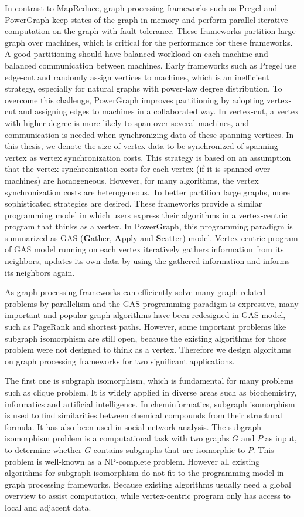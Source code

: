 In contrast to MapReduce, graph processing frameworks such as Pregel\cite{malewicz2010pregel} and PowerGraph\cite{gonzalez2012powergraph} keep states of the graph in memory and perform parallel iterative computation on the graph with fault tolerance. These frameworks partition large graph over machines, which is critical for the performance for these frameworks. A good partitioning should have balanced workload on each machine and balanced communication between machines. Early frameworks such as Pregel use edge-cut and randomly assign vertices to machines, which is an inefficient strategy, especially for natural graphs with power-law degree distribution. To overcome this challenge, PowerGraph improves partitioning by adopting vertex-cut and assigning edges to machines in a collaborated way. In vertex-cut, a vertex with higher degree is more likely to span over several machines, and communication is needed when synchronizing data of these spanning vertices. In this thesis, we denote the size of vertex data to be synchronized of spanning vertex as vertex synchronization costs. This strategy is based on an assumption that the vertex synchronization costs for each vertex (if it is spanned over machines) are homogeneous. However, for many algorithms, the vertex synchronization costs are heterogeneous. To better partition large graphs, more sophisticated strategies are desired. These frameworks provide a similar programming model in which users express their algorithms in a vertex-centric program that thinks as a vertex. In PowerGraph, this programming paradigm is summarized as GAS (\textbf{G}ather, \textbf{A}pply and \textbf{S}catter) model. Vertex-centric program of GAS model running on each vertex iteratively gathers information from its neighbors, updates its own data by using the gathered information and informs its neighbors again.

As graph processing frameworks can efficiently solve many graph-related problems by parallelism and the GAS programming paradigm is expressive, many important and popular graph algorithms have been redesigned in GAS model, such as PageRank and shortest paths. However, some important problems like subgraph isomorphism are still open, because the existing algorithms for those problem were not designed to think as a vertex.
Therefore we design algorithms on graph processing frameworks for two significant applications. 

The first one is subgraph isomorphism, which is fundamental for many problems such as clique problem. It is widely applied in diverse areas such as biochemistry, informatics and artificial intelligence. In cheminformatics, subgraph isomorphism is used to find similarities between chemical compounds from their structural formula. It has also been used in social network analysis. The subgraph isomorphism problem is a computational task with two graphs $G$ and $P$ as input, to determine whether $G$ contains subgraphs that are isomorphic to $P$. This problem is well-known as a NP-complete problem. However all existing algorithms for subgraph isomorphism do not fit to the programming model in graph processing frameworks. Because existing algorithms usually need a global overview to assist computation, while vertex-centric program only has access to local and adjacent data.

